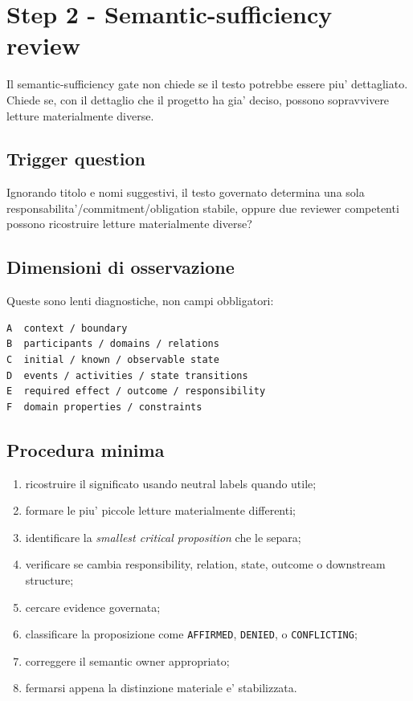 \documentclass[11pt,a4paper]{article}
\begin{document}
\section{Step 2 - Semantic-sufficiency review}
\workingtag

Il semantic-sufficiency gate non chiede se il testo potrebbe essere piu' dettagliato. Chiede se, con il dettaglio che il progetto ha gia' deciso, possono sopravvivere letture materialmente diverse.

\subsection{Trigger question}
\begin{ddtacheck}
Ignorando titolo e nomi suggestivi, il testo governato determina una sola responsabilita'/commitment/obligation stabile, oppure due reviewer competenti possono ricostruire letture materialmente diverse?
\end{ddtacheck}

\subsection{Dimensioni di osservazione}
Queste sono lenti diagnostiche, non campi obbligatori:
\begin{lstlisting}
A  context / boundary
B  participants / domains / relations
C  initial / known / observable state
D  events / activities / state transitions
E  required effect / outcome / responsibility
F  domain properties / constraints
\end{lstlisting}

\subsection{Procedura minima}
\begin{enumerate}
  \item ricostruire il significato usando neutral labels quando utile;
  \item formare le piu' piccole letture materialmente differenti;
  \item identificare la \emph{smallest critical proposition} che le separa;
  \item verificare se cambia responsibility, relation, state, outcome o downstream structure;
  \item cercare evidence governata;
  \item classificare la proposizione come \texttt{AFFIRMED}, \texttt{DENIED}, \NS{} o \texttt{CONFLICTING};
  \item correggere il semantic owner appropriato;
  \item fermarsi appena la distinzione materiale e' stabilizzata.
\end{enumerate}
\end{document}
